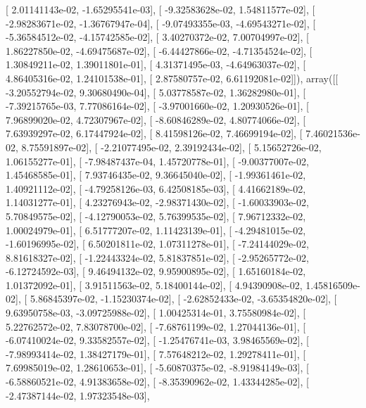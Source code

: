 \documentclass{article}
\begin{document}
       [  2.01141143e-02,  -1.65295541e-03],
       [ -9.32583628e-02,   1.54811577e-02],
       [ -2.98283671e-02,  -1.36767947e-04],
       [ -9.07493355e-03,  -4.69543271e-02],
       [ -5.36584512e-02,  -4.15742585e-02],
       [  3.40270372e-02,   7.00704997e-02],
       [  1.86227850e-02,  -4.69475687e-02],
       [ -6.44427866e-02,  -4.71354524e-02],
       [  1.30849211e-02,   1.39011801e-01],
       [  4.31371495e-03,  -4.64963037e-02],
       [  4.86405316e-02,   1.24101538e-01],
       [  2.87580757e-02,   6.61192081e-02]]), array([[ -3.20552794e-02,   9.30680490e-04],
       [  5.03778587e-02,   1.36282980e-01],
       [ -7.39215765e-03,   7.77086164e-02],
       [ -3.97001660e-02,   1.20930526e-01],
       [  7.96899020e-02,   4.72307967e-02],
       [ -8.60846289e-02,   4.80774066e-02],
       [  7.63939297e-02,   6.17447924e-02],
       [  8.41598126e-02,   7.46699194e-02],
       [  7.46021536e-02,   8.75591897e-02],
       [ -2.21077495e-02,   2.39192434e-02],
       [  5.15652726e-02,   1.06155277e-01],
       [ -7.98487437e-04,   1.45720778e-01],
       [ -9.00377007e-02,   1.45468585e-01],
       [  7.93746435e-02,   9.36645040e-02],
       [ -1.99361461e-02,   1.40921112e-02],
       [ -4.79258126e-03,   6.42508185e-03],
       [  4.41662189e-02,   1.14031277e-01],
       [  4.23276943e-02,  -2.98371430e-02],
       [ -1.60033903e-02,   5.70849575e-02],
       [ -4.12790053e-02,   5.76399535e-02],
       [  7.96712332e-02,   1.00024979e-01],
       [  6.51777207e-02,   1.11423139e-01],
       [ -4.29481015e-02,  -1.60196995e-02],
       [  6.50201811e-02,   1.07311278e-01],
       [ -7.24144029e-02,   8.81618327e-02],
       [ -1.22443324e-02,   5.81837851e-02],
       [ -2.95265772e-02,  -6.12724592e-03],
       [  9.46494132e-02,   9.95900895e-02],
       [  1.65160184e-02,   1.01372092e-01],
       [  3.91511563e-02,   5.18400144e-02],
       [  4.94390908e-02,   1.45816509e-02],
       [  5.86845397e-02,  -1.15230374e-02],
       [ -2.62852433e-02,  -3.65354820e-02],
       [  9.63950758e-03,  -3.09725988e-02],
       [  1.00425314e-01,   3.75580984e-02],
       [  5.22762572e-02,   7.83078700e-02],
       [ -7.68761199e-02,   1.27044136e-01],
       [ -6.07410024e-02,   9.33582557e-02],
       [ -1.25476741e-03,   3.98465569e-02],
       [ -7.98993414e-02,   1.38427179e-01],
       [  7.57648212e-02,   1.29278411e-01],
       [  7.69985019e-02,   1.28610653e-01],
       [ -5.60870375e-02,  -8.91984149e-03],
       [ -6.58860521e-02,   4.91383658e-02],
       [ -8.35390962e-02,   1.43344285e-02],
       [ -2.47387144e-02,   1.97323548e-03],
\end{document}
